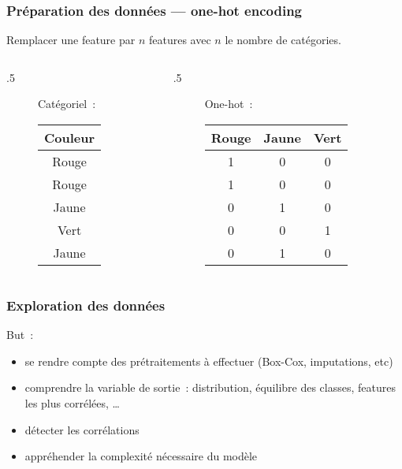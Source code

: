\documentclass{formation}
\begin{document}
\begin{frame}
  \frametitle{Préparation des données — one-hot encoding}
  Remplacer une feature par $n$ features avec $n$ le nombre de
  catégories.
  \begin{columns}
    \begin{column}{.5\tw}
      \begin{figure}
        \centering
        Catégoriel :\\[.5cm]
        \begin{tabular}{c}
          \toprule
          Couleur \\
          \midrule
          Rouge \\
          Rouge \\
          Jaune \\
          Vert \\
          Jaune \\
          \bottomrule
        \end{tabular}
      \end{figure}
    \end{column}
    \begin{column}{.5\tw}
      \begin{figure}
        \centering
        One-hot :\\[.5cm]
        \begin{tabular}{ccc}
          \toprule
          Rouge & Jaune & Vert \\
          \midrule
          1 & 0 & 0 \\
          1 & 0 & 0 \\
          0 & 1 & 0 \\
          0 & 0 & 1 \\
          0 & 1 & 0 \\
          \bottomrule
        \end{tabular}
      \end{figure}
    \end{column}
  \end{columns}
\end{frame}

\begin{frame}
  \frametitle{Exploration des données}
  But :
  \begin{itemize}[<+->]
  \item se rendre compte des prétraitements à effectuer (Box-Cox,
    imputations, etc)
  \item comprendre la variable de sortie : distribution, équilibre des
    classes, features les plus corrélées, …
  \item détecter les corrélations
  \item appréhender la complexité nécessaire du modèle
  \end{itemize}
\end{frame}
\end{document}
